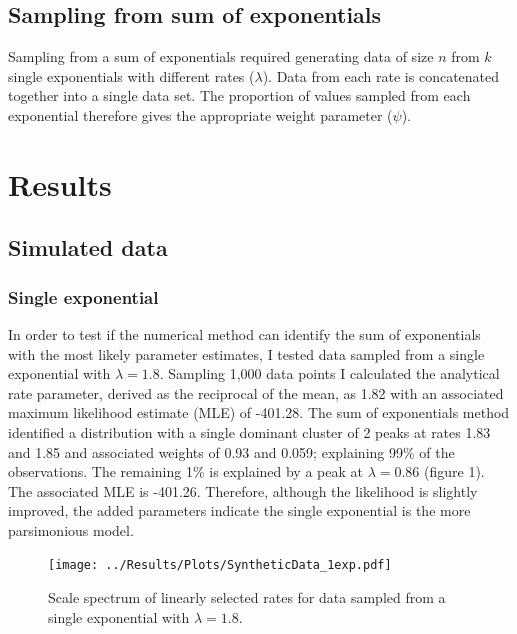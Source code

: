 \documentclass[11pt,usenames,dvipsnames,a4paper]{article}
\begin{document}
\subsection{Sampling from sum of exponentials}
\begin{linenumbers}
\hspace{\parindent}
Sampling from a sum of exponentials required generating data of size $n$ from $k$ single exponentials with different rates ($\lambda$). Data from each rate is concatenated together into a single data set. The proportion of values sampled from each exponential therefore gives the appropriate weight parameter ($\psi$).
\end{linenumbers}

\section{Results}

\noindent
\subsection{Simulated data}

\subsubsection{Single exponential}

\begin{linenumbers}
\hspace{\parindent}
In order to test if the numerical method can identify the sum of exponentials with the most likely parameter estimates, I tested data sampled from a single exponential with $\lambda = 1.8$. Sampling 1,000 data points I calculated the analytical rate parameter, derived as the reciprocal of the mean, as 1.82 with an associated maximum likelihood estimate (MLE) of -401.28. The sum of exponentials method identified a distribution with a single dominant cluster of 2 peaks at rates 1.83 and 1.85 and associated weights of 0.93 and 0.059; explaining 99\% of the observations. The remaining 1\% is explained by a peak at $\lambda = 0.86$ (figure 1). The associated MLE is -401.26. Therefore, although the likelihood is slightly improved, the added parameters indicate the single exponential is the more parsimonious model.
\end{linenumbers}
\begin{figure}[H]
	\centering
	\texttt{[image: ../Results/Plots/SyntheticData\_1exp.pdf]}
	\caption{Scale spectrum of linearly selected rates for data sampled from a single exponential with $\lambda = 1.8$.}
\end{figure}
\end{document}

